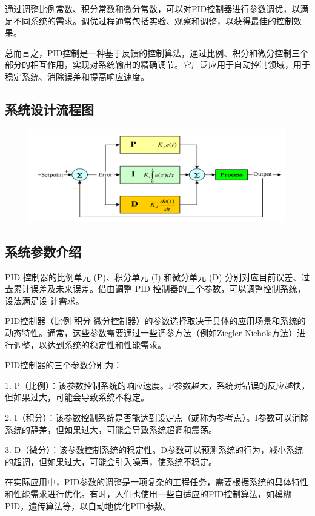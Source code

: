 \documentclass{thuemp}
\begin{document}
通过调整比例常数、积分常数和微分常数，可以对PID控制器进行参数调优，以满足不同系统的需求。调优过程通常包括实验、观察和调整，以获得最佳的控制效果。

总而言之，PID控制是一种基于反馈的控制算法，通过比例、积分和微分控制三个部分的相互作用，实现对系统输出的精确调节。它广泛应用于自动控制领域，用于稳定系统、消除误差和提高响应速度。

\subsection{系统设计流程图}
\begin{figure}[H]
\centering
\includegraphics[width=0.8\linewidth]{./img/from_internet/PID.png}
\end{figure}

\subsection{系统参数介绍}

PID 控制器的比例单元 (P)、积分单元 (I) 和微分单元 (D) 分别对应目前误差、过去累计误差及未来误差。借由调整 PID 控制器的三个参数，可以调整控制系统，设法满足设
计需求。

PID控制器（比例-积分-微分控制器）的参数选择取决于具体的应用场景和系统的动态特性。通常，这些参数需要通过一些调参方法（例如Ziegler-Nichols方法）进行调整，以达到系统的稳定性和性能需求。

PID控制器的三个参数分别为：

1. P（比例）：该参数控制系统的响应速度。P参数越大，系统对错误的反应越快，但如果过大，可能会导致系统不稳定。

2. I（积分）：该参数控制系统是否能达到设定点（或称为参考点）。I参数可以消除系统的静差，但如果过大，可能会导致系统超调和震荡。

3. D（微分）：该参数控制系统的稳定性。D参数可以预测系统的行为，减小系统的超调，但如果过大，可能会引入噪声，使系统不稳定。

在实际应用中，PID参数的调整是一项复杂的工程任务，需要根据系统的具体特性和性能需求进行优化。有时，人们也使用一些自适应的PID控制算法，如模糊PID，遗传算法等，以自动地优化PID参数。
\end{document}
